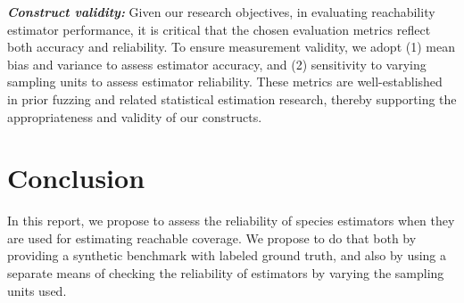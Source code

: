 \documentclass[conference,anonymous,review]{IEEEtran}
\begin{document}
\emph{\textbf{Construct validity:}} Given our research objectives, in evaluating reachability estimator performance, it is critical that the chosen evaluation metrics reflect both accuracy and reliability. To ensure measurement validity, we adopt (1) mean bias and variance to assess estimator accuracy, and (2) sensitivity to varying sampling units to assess estimator reliability. These metrics are well-established in prior fuzzing and related statistical estimation research, thereby supporting the appropriateness and validity of our constructs.


\section{Conclusion}
\label{sec:conclusion}
In this report, we propose to assess the reliability of species estimators when
they are used for estimating reachable coverage. We propose to do that both by
providing a synthetic benchmark with labeled ground truth, and also by
using a separate means of checking the reliability of estimators by varying
the sampling units used.

\balance


\end{document}
